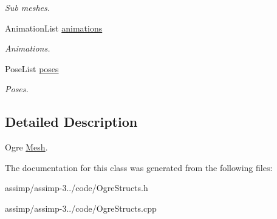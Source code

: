 \begin{DoxyCompactItemize}
\begin{DoxyCompactList}\small\item\em Sub meshes. \end{DoxyCompactList}\item 
\hypertarget{class_assimp_1_1_ogre_1_1_mesh_a7b498332d978952f21ecf29ae11b3f3a}{Animation\+List \hyperlink{class_assimp_1_1_ogre_1_1_mesh_a7b498332d978952f21ecf29ae11b3f3a}{animations}}\label{class_assimp_1_1_ogre_1_1_mesh_a7b498332d978952f21ecf29ae11b3f3a}

\begin{DoxyCompactList}\small\item\em Animations. \end{DoxyCompactList}\item 
\hypertarget{class_assimp_1_1_ogre_1_1_mesh_a6bef7b2ea800a764c9761b73f18deb16}{Pose\+List \hyperlink{class_assimp_1_1_ogre_1_1_mesh_a6bef7b2ea800a764c9761b73f18deb16}{poses}}\label{class_assimp_1_1_ogre_1_1_mesh_a6bef7b2ea800a764c9761b73f18deb16}

\begin{DoxyCompactList}\small\item\em Poses. \end{DoxyCompactList}\end{DoxyCompactItemize}


\subsection{Detailed Description}
Ogre \hyperlink{class_assimp_1_1_ogre_1_1_mesh}{Mesh}. 

The documentation for this class was generated from the following files\+:\begin{DoxyCompactItemize}
\item 
assimp/assimp-\/3../code/Ogre\+Structs.\+h\item 
assimp/assimp-\/3../code/Ogre\+Structs.\+cpp\end{DoxyCompactItemize}
